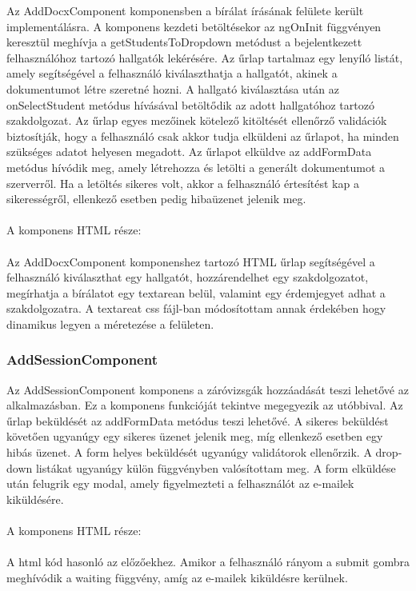 Az AddDocxComponent komponensben a bírálat írásának felülete került implementálásra. A komponens kezdeti betöltésekor az ngOnInit függvényen keresztül meghívja a getStudentsToDropdown metódust a bejelentkezett felhasználóhoz tartozó hallgatók lekérésére. Az űrlap tartalmaz egy lenyíló listát, amely segítségével a felhasználó kiválaszthatja a hallgatót, akinek a dokumentumot létre szeretné hozni. A hallgató kiválasztása után az onSelectStudent metódus hívásával betöltődik az adott hallgatóhoz tartozó szakdolgozat. Az űrlap egyes mezőinek kötelező kitöltését ellenőrző validációk biztosítják, hogy a felhasználó csak akkor tudja elküldeni az űrlapot, ha minden szükséges adatot helyesen megadott. Az űrlapot elküldve az addFormData metódus hívódik meg, amely létrehozza és letölti a generált dokumentumot a szerverről. Ha a letöltés sikeres volt, akkor a felhasználó értesítést kap a sikerességről, ellenkező esetben pedig hibaüzenet jelenik meg.\\
\\
A komponens HTML része:\\
\\
Az AddDocxComponent komponenshez tartozó HTML űrlap segítségével a felhasználó kiválaszthat egy hallgatót, hozzárendelhet egy szakdolgozatot, megírhatja a bírálatot egy textarean belül, valamint  egy érdemjegyet adhat a szakdolgozatra. A textareat css fájl-ban módosítottam annak érdekében hogy dinamikus legyen a méretezése a felületen.

\subsubsection{AddSessionComponent}

Az AddSessionComponent komponens a záróvizsgák hozzáadását teszi lehetővé az alkalmazásban. Ez a komponens funkcióját tekintve megegyezik az utóbbival. Az űrlap beküldését az addFormData metódus teszi lehetővé. A sikeres beküldést követően ugyanúgy egy sikeres üzenet jelenik meg, míg ellenkező esetben egy hibás üzenet. A form helyes beküldését ugyanúgy validátorok ellenőrzik. A drop-down listákat ugyanúgy külön függvényben valósítottam meg. A form elküldése után felugrik egy modal, amely figyelmezteti a felhasználót az e-mailek kiküldésére.\\
\\
A komponens HTML része:\\
\\
A html kód hasonló az előzőekhez. Amikor a felhasználó rányom a submit gombra meghívódik a waiting függvény, amíg az e-mailek kiküldésre kerülnek.


